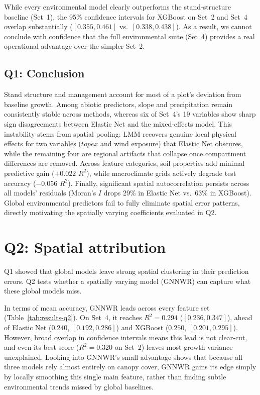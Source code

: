 \documentclass[logo,msc,ai]{infthesis}           %
\begin{document}
While every environmental model clearly outperforms the stand-structure baseline (Set~1), the 95\% confidence intervals for XGBoost on Set~2 and Set~4 overlap substantially ($[0.355, 0.461]$ vs.\ $[0.338, 0.438]$). As a result, we cannot conclude with confidence that the full environmental suite (Set~4) provides a real operational advantage over the simpler Set~2.



\subsection*{Q1: Conclusion}
Stand structure and management account for most of a plot's deviation from baseline growth. Among abiotic predictors, slope and precipitation remain consistently stable across methods, whereas six of Set~4's 19 variables show sharp sign disagreements between Elastic Net and the mixed-effects model. This instability stems from spatial pooling: LMM recovers genuine local physical effects for two variables ($\mathit{topex}$ and wind exposure) that Elastic Net obscures, while the remaining four are regional artifacts that collapse once compartment differences are removed. Across feature categories, soil properties add minimal predictive gain ($+0.022$ $R^2$), while macroclimate grids actively degrade test accuracy ($-0.056$ $R^2$). Finally, significant spatial autocorrelation persists across all models' residuals (Moran's $I$ drops 29\% in Elastic Net vs.\ 63\% in XGBoost). Global environmental predictors fail to fully eliminate spatial error patterns, directly motivating the spatially varying coefficients evaluated in Q2.
\section*{Q2: Spatial attribution}
Q1 showed that global models leave strong spatial clustering in their prediction errors. Q2 tests whether a spatially varying model (GNNWR) can capture what these global models miss.

In terms of mean accuracy, GNNWR leads across every feature set (Table~\ref{tab:results-q2}). On Set~4, it reaches $R^2 = 0.294$ ($[0.236, 0.347]$), ahead of Elastic Net ($0.240$, $[0.192, 0.286]$) and XGBoost ($0.250$, $[0.201, 0.295]$). However, broad overlap in confidence intervals means this lead is not clear-cut, and even its best score ($R^2 = 0.320$ on Set~2) leaves most growth variance unexplained. Looking into GNNWR's small advantage shows that because all three models rely almost entirely on canopy cover, GNNWR gains its edge simply by locally smoothing this single main feature, rather than finding subtle environmental trends missed by global baselines.
\end{document}
